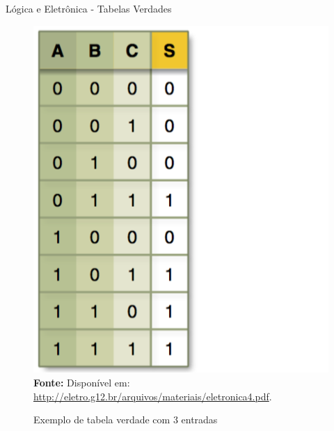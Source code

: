 \documentclass[aspectratio=169]{beamer}
\begin{document}
	\begin{frame}{Lógica e Eletrônica - Tabelas Verdades}
			\begin{figure}[h]
				\centering
				\caption{Exemplo de tabela verdade com 3 entradas}
				\includegraphics[height=0.7\textheight]{img/ed/ed-tabela_circuito1.png}
				\\
				{\footnotesize \textbf{Fonte:} Disponível em: \url{http://eletro.g12.br/arquivos/materiais/eletronica4.pdf}.}
				\label{fig:ed-tabela_circuito1}
			\end{figure}
	\end{frame}
	
\end{document}
